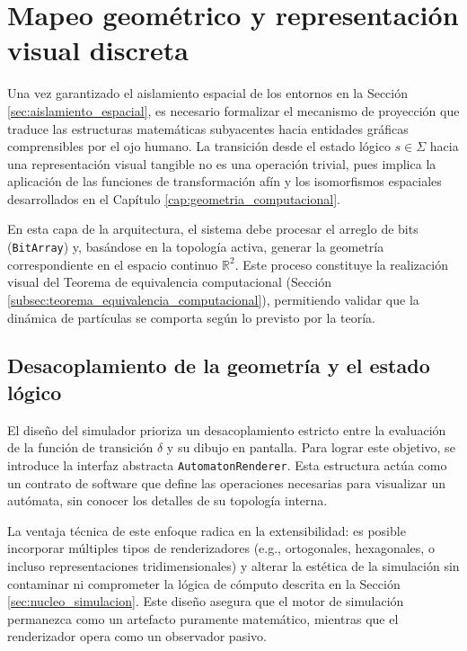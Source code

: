 \section{Mapeo geométrico y representación visual discreta}
\label{sec:mapeo_geometrico}

Una vez garantizado el aislamiento espacial de los entornos en la Sección \ref{sec:aislamiento_espacial}, es necesario formalizar el mecanismo de proyección que traduce las estructuras matemáticas subyacentes hacia entidades gráficas comprensibles por el ojo humano. La transición desde el estado lógico $s \in \Sigma$ hacia una representación visual tangible no es una operación trivial, pues implica la aplicación de las funciones de transformación afín y los isomorfismos espaciales desarrollados en el Capítulo \ref{cap:geometria_computacional}.

En esta capa de la arquitectura, el sistema debe procesar el arreglo de bits (\texttt{BitArray}) y, basándose en la topología activa, generar la geometría correspondiente en el espacio continuo $\mathbb{R}^2$. Este proceso constituye la realización visual del Teorema de equivalencia computacional (Sección \ref{subsec:teorema_equivalencia_computacional}), permitiendo validar que la dinámica de partículas se comporta según lo previsto por la teoría.

\subsection{Desacoplamiento de la geometría y el estado lógico}

El diseño del simulador prioriza un desacoplamiento estricto entre la evaluación de la función de transición $\delta$ y su dibujo en pantalla. Para lograr este objetivo, se introduce la interfaz abstracta \texttt{AutomatonRenderer}. Esta estructura actúa como un contrato de software que define las operaciones necesarias para visualizar un autómata, sin conocer los detalles de su topología interna.

La ventaja técnica de este enfoque radica en la extensibilidad: es posible incorporar múltiples tipos de renderizadores (e.g., ortogonales, hexagonales, o incluso representaciones tridimensionales) y alterar la estética de la simulación sin contaminar ni comprometer la lógica de cómputo descrita en la Sección \ref{sec:nucleo_simulacion}. Este diseño asegura que el motor de simulación permanezca como un artefacto puramente matemático, mientras que el renderizador opera como un observador pasivo.

